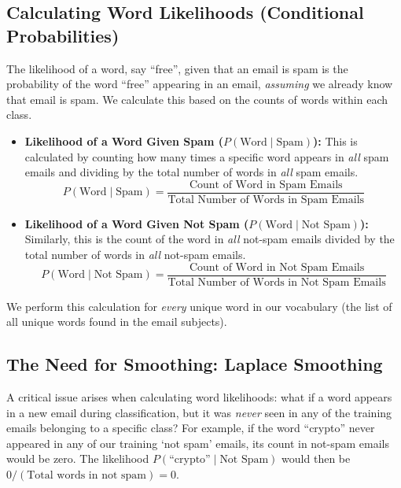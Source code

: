 \documentclass[12pt,letterpaper]{article}
\begin{document}
\subsection{Calculating Word Likelihoods (Conditional Probabilities)}

The likelihood of a word, say ``free'', given that an email is spam is the probability of the word ``free'' appearing in an email, \textit{assuming} we already know that email is spam. We calculate this based on the counts of words within each class.

\begin{itemize}
    \item \textbf{Likelihood of a Word Given Spam ($P(\text{Word} \mid \text{Spam})$):} This is calculated by counting how many times a specific word appears in \textit{all} spam emails and dividing by the total number of words in \textit{all} spam emails.
    \begin{equation}
    P(\text{Word} \mid \text{Spam}) = \frac{\text{Count of Word in Spam Emails}}{\text{Total Number of Words in Spam Emails}}
    \end{equation}
    
    \item \textbf{Likelihood of a Word Given Not Spam ($P(\text{Word} \mid \text{Not Spam})$):} Similarly, this is the count of the word in \textit{all} not-spam emails divided by the total number of words in \textit{all} not-spam emails.
    \begin{equation}
    P(\text{Word} \mid \text{Not Spam}) = \frac{\text{Count of Word in Not Spam Emails}}{\text{Total Number of Words in Not Spam Emails}}
    \end{equation}
\end{itemize}

We perform this calculation for \textit{every} unique word in our vocabulary (the list of all unique words found in the email subjects).

\subsection{The Need for Smoothing: Laplace Smoothing}

A critical issue arises when calculating word likelihoods: what if a word appears in a new email during classification, but it was \textit{never} seen in any of the training emails belonging to a specific class? For example, if the word ``crypto'' never appeared in any of our training `not spam' emails, its count in not-spam emails would be zero. The likelihood $P(\text{``crypto''} \mid \text{Not Spam})$ would then be $0 / (\text{Total words in not spam}) = 0$.
\end{document}
